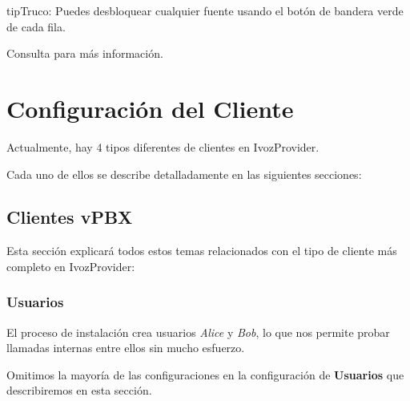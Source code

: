 \documentclass[letterpaper,10pt,spanish]{sphinxmanual}
\begin{document}
\begin{notice}{tip}{Truco:}
Puedes desbloquear cualquier fuente usando el botón de bandera verde de cada fila.
\end{notice}

Consulta {\hyperref[security_and_maintenance/security/antibruteforce:anti\string-brute\string-force\string-attacks]{}} para más información.


\chapter{Configuración del Cliente}
\label{administration_portal/client/index:client-configuration}\label{administration_portal/client/index::doc}
Actualmente, hay 4 tipos diferentes de clientes en IvozProvider.

Cada uno de ellos se describe detalladamente en las siguientes secciones:
\label{administration_portal/client/vpbx/index:vpbx-clients}

\section{Clientes vPBX}
\label{administration_portal/client/vpbx/index:vpbx-clients}\label{administration_portal/client/vpbx/index:clientes-vpbx}\label{administration_portal/client/vpbx/index::doc}\label{administration_portal/client/vpbx/index:id1}
Esta sección explicará todos estos temas relacionados con el tipo de cliente más completo en IvozProvider:


\subsection{Usuarios}
\label{administration_portal/client/vpbx/users::doc}\label{administration_portal/client/vpbx/users:users}\label{administration_portal/client/vpbx/users:id1}
El proceso de instalación crea usuarios \emph{Alice} y \emph{Bob}, lo que nos permite probar llamadas internas entre ellos sin mucho esfuerzo.

Omitimos la mayoría de las configuraciones en la configuración de \textbf{Usuarios} que describiremos en esta sección.
\end{document}
